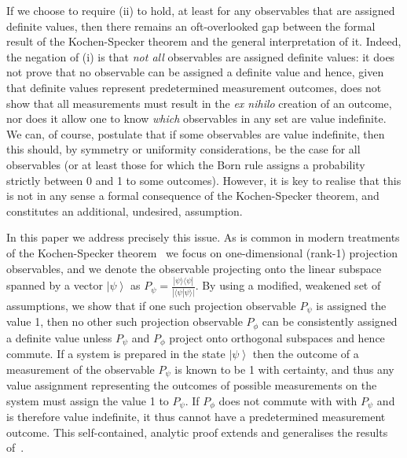 \documentclass[%
 superscriptaddress,
 preprint,
 showpacs,
 showkeys,
 nofootinbib,
  amsmath,amssymb,
  aps,
  longbibliography,
  floatfix,
 ]{revtex4-1}
\theoremstyle{definition}
\newcommand{\ket}[1]{\left| #1 \right>}
\newcommand{\iprod}[2]{\langle #1 | #2 \rangle}
\newcommand{\oprod}[2]{| #1 \rangle\langle #2 |}
\begin{document}
If we choose to require (ii) to hold, at least for any observables that are assigned definite values, %
then there remains an oft-overlooked gap between the formal result of the Kochen-Specker theorem and the general interpretation of it.
Indeed, the negation of (i) is that \emph{not all} observables are assigned definite values: it does not prove that no observable can be assigned a definite value and hence, given that definite values represent predetermined measurement outcomes, does not show
that all measurements must result in the \emph{ex nihilo} creation of an outcome, nor does it allow one to know \emph{which} observables in any set are value indefinite.
We can, of course, postulate that if some observables are value indefinite, then this should,
by symmetry or uniformity considerations, be the case for all observables (or at least those for which the Born rule assigns a probability strictly between 0 and 1 to some outcomes).
However, it is key to realise that this is not in any sense a formal consequence of the Kochen-Specker theorem, and constitutes an additional, undesired, assumption.

{\color{blue}
In this paper we address precisely this issue.
As is common in modern treatments of the Kochen-Specker theorem~\cite{Cabello:1994ly,Cabello:1996zr,Peres:1991ys} we focus on one-dimensional (rank-1) projection observables, and we denote the observable projecting onto the linear subspace spanned by a vector $\ket{\psi}$ as $P_\psi=\frac{\oprod{\psi}{\psi}}{|\iprod{\psi}{\psi}|}$.
By using a modified, weakened set of assumptions, we show that if one such projection observable $P_\psi$ is assigned the value 1, then no other such projection observable $P_\phi$ can be consistently assigned a definite value unless $P_\psi$ and $P_\phi$ project onto orthogonal subspaces and hence commute.
If a system is prepared in the state $\ket{\psi}$ then the outcome of a measurement of the observable $P_\psi$ %
is known to be 1 with certainty, and
}
thus any value assignment representing the outcomes of possible measurements on the system must assign the value 1 to $P_\psi${\color{blue}. If $P_\phi$ does not commute with with $P_\psi$ and is therefore value indefinite, it thus} cannot have a predetermined measurement outcome.
This self-contained, analytic proof extends and generalises the results of~\cite{Abbott:2012fk,Abbott:2013ly}.
\end{document}
